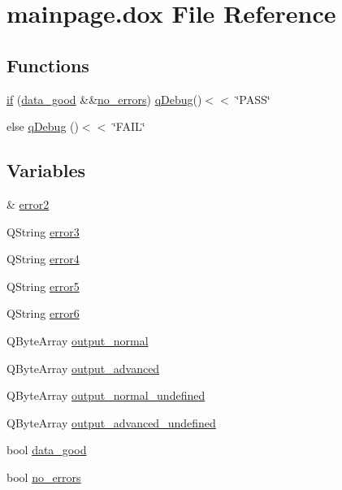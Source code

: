 \hypertarget{mainpage_8dox}{}\section{mainpage.\+dox File Reference}
\label{mainpage_8dox}
\subsection*{Functions}
\begin{DoxyCompactItemize}
\item 
\hyperlink{mainpage_8dox_ab32535385f555c3cadd63093def47b17}{if} (\hyperlink{mainpage_8dox_a44c9a5050c8545eaf2e796025ab6f6cc}{data\+\_\+good} \&\&\hyperlink{mainpage_8dox_a3a32a631757c3fe2d38655ea361cb2cc}{no\+\_\+errors}) \hyperlink{mainpage_8dox_a8bceae478e38c215e869968270c33543}{q\+Debug}()$<$$<$ \char`\"{}P\+A\+SS\char`\"{}
\item 
else \hyperlink{mainpage_8dox_a8bceae478e38c215e869968270c33543}{q\+Debug} ()$<$$<$ \char`\"{}F\+A\+IL\char`\"{}
\end{DoxyCompactItemize}
\subsection*{Variables}
\begin{DoxyCompactItemize}
\item 
\& \hyperlink{mainpage_8dox_a019326b383003608b449e099257babad}{error2}
\item 
Q\+String \hyperlink{mainpage_8dox_a0a5bd4c1e9106a6efb2b5ab3cbb58e29}{error3}
\item 
Q\+String \hyperlink{mainpage_8dox_adaaa766e0e5f054f58075fa0583c7ea2}{error4}
\item 
Q\+String \hyperlink{mainpage_8dox_ad35f2250b1706e4aefd45d82d2aa1255}{error5}
\item 
Q\+String \hyperlink{mainpage_8dox_a92da3be57b27bb827f55e05120cb9827}{error6}
\item 
Q\+Byte\+Array \hyperlink{mainpage_8dox_a0afa9d6eb2804da072bf16223098cab5}{output\+\_\+normal}
\item 
Q\+Byte\+Array \hyperlink{mainpage_8dox_afda71a8afe6713d362810784355a3b3f}{output\+\_\+advanced}
\item 
Q\+Byte\+Array \hyperlink{mainpage_8dox_a2acf283263ed72aa1a26ed7dd98aa62a}{output\+\_\+normal\+\_\+undefined}
\item 
Q\+Byte\+Array \hyperlink{mainpage_8dox_a7415e312c3c8019034882cde9a8d048d}{output\+\_\+advanced\+\_\+undefined}
\item 
bool \hyperlink{mainpage_8dox_a44c9a5050c8545eaf2e796025ab6f6cc}{data\+\_\+good}
\item 
bool \hyperlink{mainpage_8dox_a3a32a631757c3fe2d38655ea361cb2cc}{no\+\_\+errors}
\end{DoxyCompactItemize}


